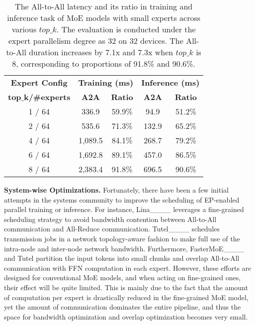\begin{table}[!t]
    \centering
    \begin{tabular}{c|cc|cc}
    \toprule[0.8pt]
    \textbf{Expert Config} & \multicolumn{2}{c|}{\textbf{Training (ms)}} & \multicolumn{2}{c}{\textbf{Inference (ms)}} \\
    \textbf{$\bm{top\_k}$/\#experts } & \textbf{A2A}        & \textbf{Ratio}        & \textbf{A2A}        & \textbf{Ratio}        \\ \midrule[0.8pt]
    1 / 64   &     336.9          &  59.9\%            &     94.9			&	51.2\%    \\
    2 / 64   &     535.6          &  71.3\%            &     132.9			&	65.2\%        \\
    4 / 64   &     1,089.5          &  84.1\%            &     268.7			&	79.2\%    \\
    6 / 64   &     1,692.8          &  89.1\%            &     457.0			&	86.5\%         \\
    8 / 64   &     2,383.4          &  91.8\%            &     696.5			&	90.6\%    \\ 
    \bottomrule[0.8pt]
    \end{tabular}
    \caption{The All-to-All latency and its ratio in training and inference task of MoE models with small experts across various $top\_k$. The evaluation is conducted under the expert parallelism degree as 32 on 32 devices. The All-to-All duration increases by 7.1x and 7.3x when $top\_k$ is 8, corresponding to proportions of 91.8\% and 90.6\%.
}
    \label{table.comm.ratio}
\end{table}

\noindent\textbf{System-wise Optimizations. }
Fortunately, there have been a few initial attempts in the systems community to improve the scheduling of EP-enabled parallel training or inference. 
For instance, Lina____ leverages a fine-grained scheduling strategy to avoid bandwidth contention between All-to-All communication and All-Reduce communication. 
Tutel____ schedules transmission jobs in a network topology-aware fashion %
to make full use of the intra-node and inter-node network bandwidth. 
Furthermore, FasterMoE____ and Tutel partition the input tokens into small chunks and overlap All-to-All communication with FFN computation in each expert. 
However, these efforts are designed for conventional MoE models, and when acting on fine-grained ones, their effect will be quite limited. This is mainly due to the fact that the amount of computation per expert is drastically reduced in the fine-grained MoE model, yet the amount of communication dominates the entire pipeline, and thus the space for bandwidth optimization and overlap optimization becomes very small.

